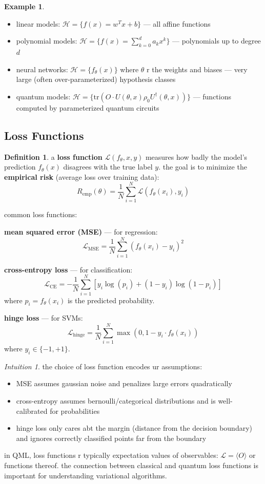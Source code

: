 \documentclass[11pt,a4paper]{article}
\theoremstyle{definition}
\newtheorem{definition}{Definition}[section]
\newtheorem{example}{Example}[section]
\theoremstyle{remark}
\newtheorem*{intuition}{Intuition}
\begin{document}
\begin{example}
\begin{itemize}
    \item linear models: $\mathcal{H} = \{f(x) = w^T x + b\}$ --- all affine functions
    \item polynomial models: $\mathcal{H} = \{f(x) = \sum_{k=0}^d a_k x^k\}$ --- polynomials up to degree $d$
    \item neural networks: $\mathcal{H} = \{f_\theta(x)\}$ where $\theta$ r the weights and biases --- very large (often over-parameterized) hypothesis classes
    \item quantum models: $\mathcal{H} = \{\text{tr}(O \cdot U(\theta, x)\rho_0 U^\dagger(\theta, x))\}$ --- functions computed by parameterized quantum circuits
\end{itemize}
\end{example}

\subsection{Loss Functions}

\begin{definition}
a \textbf{loss function} $\mathcal{L}(f_\theta, x, y)$ measures how badly the model's prediction $f_\theta(x)$ disagrees with the true label $y$. the goal is to minimize the \textbf{empirical risk} (average loss over training data):
\[
\boxed{R_{\text{emp}}(\theta) = \frac{1}{N}\sum_{i=1}^N \mathcal{L}(f_\theta(x_i), y_i)}
\]
\end{definition}

common loss functions:

\textbf{mean squared error (MSE)} --- for regression:
\[
\mathcal{L}_{\text{MSE}} = \frac{1}{N}\sum_{i=1}^N (f_\theta(x_i) - y_i)^2
\]

\textbf{cross-entropy loss} --- for classification:
\[
\mathcal{L}_{\text{CE}} = -\frac{1}{N}\sum_{i=1}^N \left[y_i \log(p_i) + (1-y_i)\log(1-p_i)\right]
\]
where $p_i = f_\theta(x_i)$ is the predicted probability.

\textbf{hinge loss} --- for SVMs:
\[
\mathcal{L}_{\text{hinge}} = \frac{1}{N}\sum_{i=1}^N \max(0, 1 - y_i \cdot f_\theta(x_i))
\]
where $y_i \in \{-1, +1\}$.

\begin{intuition}
the choice of loss function encodes ur assumptions:
\begin{itemize}
    \item MSE assumes gaussian noise and penalizes large errors quadratically
    \item cross-entropy assumes bernoulli/categorical distributions and is well-calibrated for probabilities
    \item hinge loss only cares abt the margin (distance from the decision boundary) and ignores correctly classified points far from the boundary
\end{itemize}
in QML, loss functions r typically expectation values of observables: $\mathcal{L} = \langle O \rangle$ or functions thereof. the connection between classical and quantum loss functions is important for understanding variational algorithms.
\end{intuition}
\end{document}
